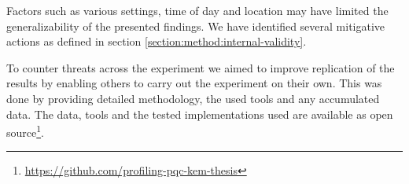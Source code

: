 Factors such as various settings, time of day and location may have limited the generalizability of the presented findings. We have identified several mitigative actions as defined in section \ref{section:method:internal-validity}.

To counter threats across the experiment we aimed to improve replication of the results by enabling others to carry out the experiment on their own. This was done by providing detailed methodology, the used tools and any accumulated data. The data, tools and the tested implementations used are available as open source\footnote{\url{https://github.com/profiling-pqc-kem-thesis}}.

\iffalse
\todo[inline]{
Vi mäter bara Intel x86, ingen AMD. Svårt att generalisera då?
}

\todo[inline]{
Vi behövde köra om micro en jäkla massa gånger - främst på gammal / "low-end" hårdvara. Low-end-laptop fick inte komplett data trots många omkörningar.
}

\todo[inline]{
only a single run of callgrind on mceliece and ntru's tests. mceliece is non-deterministic and may behave weird in a single run.
}

\todo[inline]{Validity: vänd på körschemat när man kör så att inte NTRU får köras på natten varje gång - utan att sådana saker slås ut.}

\todo[inline]{Svårt att mäta på IBM och i molnet?}

\todo[inline]{diskutera hur benchmarks inte säkerställer att rätt svar ges från algoritmerna. Detta utelämnas p.g.a. prestanda / träffsäkerhet i mätningar. Vi löser det genom att ha tester som är samma kod som benchmarken, fast med validering}

\todo[inline]{
-- Dedicated hardware for mainframes may behave differently
}

\todo[inline]{Swap locks the system while writing/reading to from disk}

\todo[inline]{We have only selected a subset of potential optimizations?}
\fi